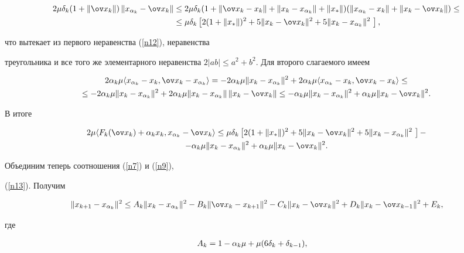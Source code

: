 \begin{pf}
\begin{align*}
2\mu \dk(1+\|\ov x_k\|)\, \|\xak -\ov x_k \|


&\leq 2\mu \dk (1+\|\ov x_k-x_k\|+\D+\|x_*\|)(\|\xak -x_k\|+


\|x_k-\ov x_k\|)\leq\\


&\leq \mu \dk\left[2\K^2+


5\Bx^2 + 5 \D^2\ \right],


\end{align*}


что вытекает из первого неравенства (\ref{n12}), неравенства


треугольника и все того же элементарного неравенства $2|ab|\leq


a^2+b^2$. Для второго слагаемого имеем


\begin{multline*}


2\ak\mu \lft \xak-x_k, \ov x_k-\xak\rgt=


-2\ak\mu\D^2+2\ak\mu\lft \xak-x_k,\ov x_k- x_k\rgt\leq \\


\leq -2\ak\mu\D^2+2\ak\mu\D\,\Bx


\leq -\ak\mu\D^2+\ak\mu\Bx^2.


\end{multline*}


В итоге


\begin{multline}\label{n13} 


2\mu \lft \Fa, \xak -\ov x_k \rgt\leq


\mu \dk\left[2\K^2+ 5\Bx^2 +


5\D^2\ \right]- \\


- \ak\mu\D^2+\ak\mu\Bx^2.


\end{multline}


Объединим теперь соотношения (\ref{n7}) и (\ref{n9}),


(\ref{n13}). Получим


\begin{equation}\label{n15}


\DD^2\leq A_k\D^2-B_k\Ax^2-C_k\Bx^2+D_k\Cx^2+E_k,


\end{equation}


где


\begin{gather*}


A_k=1-\alpha_k\mu+\mu(6\dk+\dkk),\quad



\end{gather*}
\end{pf}
